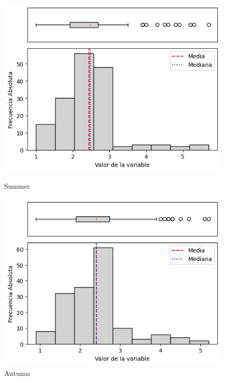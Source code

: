 \begin{figure}[H]
\centering
\begin{minipage}{0.30\textwidth}
  \includegraphics[width=\linewidth]{resultados/por_estacion_del_anio/boxplot_clases_por_estacion/Andahuaylas/WS_HistBoxplot_Summer.png}
  \caption*{Summer}
\end{minipage}
\hfill
\begin{minipage}{0.30\textwidth}
  \includegraphics[width=\linewidth]{resultados/por_estacion_del_anio/boxplot_clases_por_estacion/Andahuaylas/WS_HistBoxplot_Autumn.png}
  \caption*{Autumn}
\end{minipage}

\vspace{0.2cm}


\end{figure}
